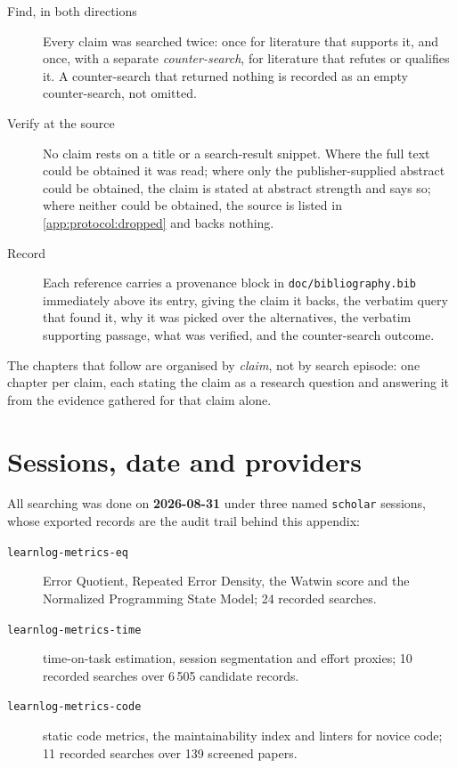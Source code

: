 \begin{description}
\item[Find, in both directions] Every claim was searched twice: once for
  literature that supports it, and once, with a separate
  \emph{counter-search}, for literature that refutes or qualifies it.  A
  counter-search that returned nothing is recorded as an empty
  counter-search, not omitted.
\item[Verify at the source] No claim rests on a title or a search-result
  snippet.  Where the full text could be obtained it was read; where only
  the publisher-supplied abstract could be obtained, the claim is stated at
  abstract strength and says so; where neither could be obtained, the source
  is listed in \cref{app:protocol:dropped} and backs nothing.
\item[Record] Each reference carries a provenance block in
  \nolinkurl{doc/bibliography.bib} immediately above its entry, giving the
  claim it backs, the verbatim query that found it, why it was picked over
  the alternatives, the verbatim supporting passage, what was verified, and
  the counter-search outcome.
\end{description}

The chapters that follow are organised by \emph{claim}, not by search
episode: one chapter per claim, each stating the claim as a research
question and answering it from the evidence gathered for that claim alone.

\section{Sessions, date and providers}
\label{app:protocol:sessions}

All searching was done on \textbf{2026-08-31} under three named
\texttt{scholar} sessions, whose exported records are the audit trail behind
this appendix:

\begin{description}
\item[\texttt{learnlog-metrics-eq}] Error Quotient, Repeated Error Density,
  the Watwin score and the Normalized Programming State Model; 24 recorded
  searches.
\item[\texttt{learnlog-metrics-time}] time-on-task estimation, session
  segmentation and effort proxies; 10 recorded searches over 6\,505
  candidate records.
\item[\texttt{learnlog-metrics-code}] static code metrics, the
  maintainability index and linters for novice code; 11 recorded searches
  over 139 screened papers.
\end{description}

